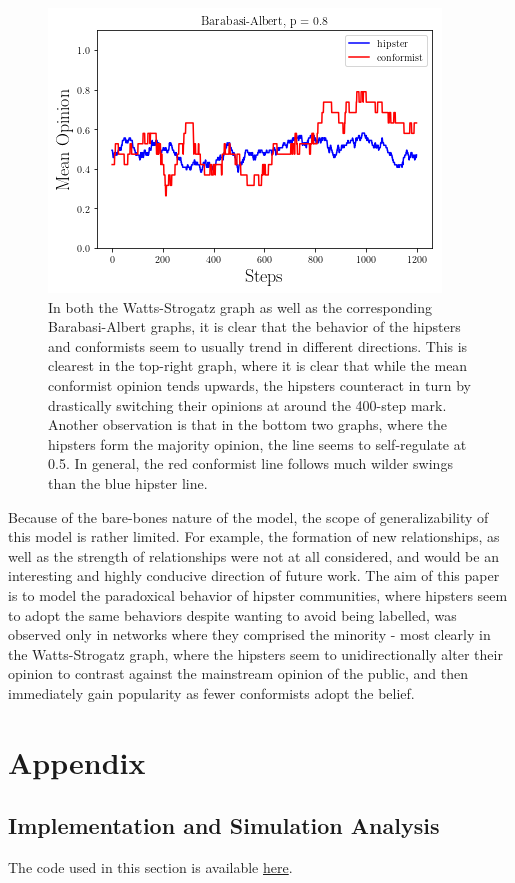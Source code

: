 \documentclass{article}
\begin{document}
\begin{figure}[h!]
\includegraphics[scale = 0.6]{ba4.png}

\caption{In both the Watts-Strogatz graph as well as the corresponding Barabasi-Albert graphs, it is clear that the behavior of the hipsters and conformists seem to usually trend in different directions. This is clearest in the top-right graph, where it is clear that while the mean conformist opinion tends upwards, the hipsters counteract in turn by drastically switching their opinions at around the 400-step mark. Another observation is that in the bottom two graphs, where the hipsters form the majority opinion, the line seems to self-regulate at 0.5. In general, the red conformist line follows much wilder swings than the blue hipster line.}
\end{figure}

Because of the bare-bones nature of the model, the scope of generalizability of this model is rather limited. For example, the formation of new relationships, as well as the strength of relationships were not at all considered, and would be an interesting and highly conducive direction of future work. The aim of this paper is to model the paradoxical behavior of hipster communities, where hipsters seem to adopt the same behaviors despite wanting to avoid being labelled, was observed only in networks where they comprised the minority - most clearly in the Watts-Strogatz graph, where the hipsters seem to unidirectionally alter their opinion to contrast against the mainstream opinion of the public, and then immediately gain popularity as fewer conformists adopt the belief. \\




\newpage
\section*{Appendix}


\subsection*{Implementation and Simulation Analysis}
The code used in this section is available \href{https://github.com/thetruejacob/CS166/blob/master/Network%20Simulation%20Assignment/Network%20Simulation.ipynb}{here}.
\end{document}
